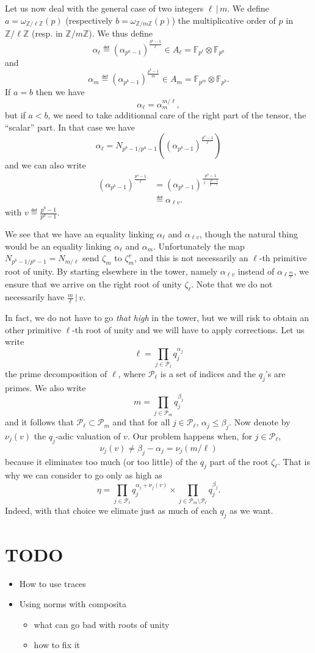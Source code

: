 \documentclass[a4paper,11pt]{article}
\begin{document}
Let us now deal with the general case of two integers $\ell\,|\,m$. We define
$a=\omega_{\mathbb{Z}/\ell\mathbb{Z}}(p)$ (respectively
$b=\omega_{\mathbb{Z}/m\mathbb{Z}}(p)$) the multiplicative order of $p$ in
$\mathbb{Z}/\ell\mathbb{Z}$ (resp. in $\mathbb{Z}/m\mathbb{Z}$). We thus define
\[
  \alpha_\ell\eqdef(\alpha_{p^a-1})^{\frac{p^a-1}{\ell}}\in A_{\ell}=\mathbb{F}_{p^\ell}\otimes \mathbb{F}_{p^a}
\]
and
\[
  \alpha_m\eqdef(\alpha_{p^b-1})^{\frac{p^{b}-1}{m}}\in A_m=\mathbb{F}_{p^m}\otimes \mathbb{F}_{p^b}.
\]
If $a=b$ then we have 
\[
  \alpha_{\ell}=\alpha_m^{m/\ell},
\]
but if $a<b$, we need to take additionnal care of the right part of the tensor,
the ``scalar'' part. In that case we have
\[
  \alpha_\ell=N_{p^b-1/p^a-1}((\alpha_{p^b-1})^{\frac{p^a-1}{\ell}})
\]
and we can also write 
\begin{align*}
  (\alpha_{p^b-1})^{\frac{p^a-1}{\ell}}&=(\alpha_{p^b-1})^{\frac{p^b-1}{\ell\cdot\frac{p^b-1}{p^a-1}}}\\
  &\eqdef \alpha_{\ell v}.
\end{align*}
with $v\eqdef\frac{p^b-1}{p^a-1}$.

We see that we have an equality linking $\alpha_\ell$ and
$\alpha_{\ell v}$, though the natural thing would be an
equality linking $\alpha_\ell$ and $\alpha_m$. Unfortunately the map
$N_{p^b-1/p^a-1}=N_{m/\ell}$ send $\zeta_{m}$ to
$\zeta_{m}^{v}$, and this is not necessarily an $\ell$-th primitive root of unity.
By starting elsewhere in the tower, namely $\alpha_{\ell v}$ instead of
$\alpha_{\ell \frac{m}{\ell}}$, we ensure that we arrive on the right root of
unity $\zeta_{\ell}$. Note that we do not necessarily have
$\frac{m}{\ell}\,|\,v$.

In fact, we do not have to go \emph{that high} in the tower, but we will risk to
obtain an other primitive $\ell$-th root of unity and we will have to apply
corrections. Let us write
\[
  \ell=\prod_{j\in\mathcal P_\ell}q_j^{\alpha_j}
\]
the prime decomposition of $\ell$, where $\mathcal P_\ell$ is a set of indices
and the $q_j$'s are primes. We also write
\[
  m=\prod_{j\in\mathcal P_m}q_j^{\beta_j}
\]
and it follows that $\mathcal P_\ell\subset\mathcal P_m$ and that for all
$j\in\mathcal P_\ell$, $\alpha_j\leq\beta_j$. Now denote by $\nu_j(v)$ the
$q_j$-adic valuation of $v$. Our problem happens when, for $j\in\mathcal
P_\ell$,
\[
  \nu_j(v)\neq \beta_j-\alpha_j=\nu_j(m/\ell)
\]
because it eliminates too much (or too little) of the $q_j$ part of the root $\zeta_\ell$. That
is why we can consider to go only as high as 
\[
  \eta=\prod_{j\in\mathcal
  P_\ell}q_j^{\alpha_j+\nu_j(v)}\times\prod_{j\in\mathcal P_m\setminus \mathcal
  P_\ell}q_j^{\beta_j}.
\]
Indeed, with that choice we elimate just as much of each $q_j$ as we want.

\section{TODO}
\begin{itemize}
  \item How to use traces
  \item Using norms with composita
    \begin{itemize}
      \item what can go bad with roots of unity
      \item how to fix it
    \end{itemize}
\end{itemize}
\end{document}
